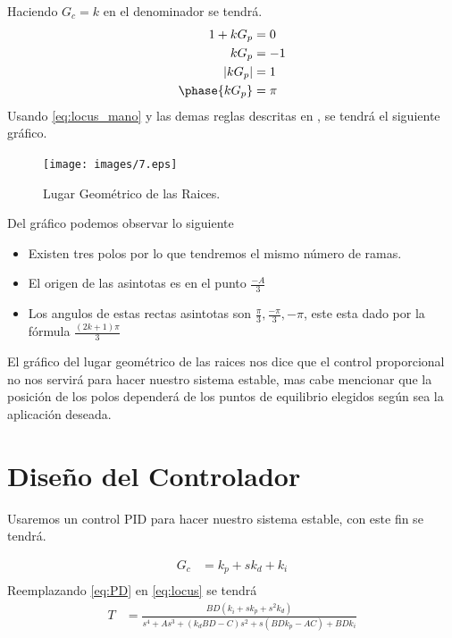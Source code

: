 \documentclass[a4paper]{IEEEtran} %
\begin{document}
Haciendo $G_{c}=k$ en el denominador se tendrá.
\begin{equation}
    \begin{split}
        1+kG_{p}&=0\\
        kG_{p}&=-1\\
        |kG_{p}|&=1\\
        \phase{kG_{p}}&=\pi\\
    \end{split}
    \label{eq:locus_mano}
\end{equation}
Usando \ref{eq:locus_mano} y las demas reglas descritas en  \cite{dorf2005sistemas}, se tendrá el siguiente gráfico.
\begin{figure}[h]
    \centering
        \texttt{[image: images/7.eps]}
        \caption{Lugar Geométrico de las Raices.}
        \label{fig:locus}
\end{figure}

Del gráfico podemos observar lo siguiente

\begin{itemize}
    \item Existen tres polos por lo que tendremos el mismo número de ramas.
    \item El origen de las asintotas es en el punto $\frac{-A}{3}$
    \item Los angulos de estas rectas asintotas son $\frac{\pi}{3},\frac{-\pi}{3},-\pi$, este esta dado por la fórmula $\frac{(2k+1)\pi}{3}$
\end{itemize}

El gráfico del lugar geométrico de las raices nos dice que el control proporcional no nos servirá para hacer nuestro sistema estable, mas cabe mencionar que la posición de los polos dependerá de los puntos de equilibrio elegidos según sea la aplicación deseada. 

\section{Diseño del Controlador}

Usaremos un control PID para hacer nuestro sistema estable, con este fin se tendrá.

\begin{equation}
    \begin{split}
        G_{c}&=k_{p}+sk_{d}+k_{i}\\
    \end{split}
    \label{eq:PD}
\end{equation}
Reemplazando \ref{eq:PD} en \ref{eq:locus} se tendrá
\begin{equation}
    \begin{split}
        T&=\frac{BD(k_{i}+sk_{p}+s^2k_{d})}{s^4+As^3+(k_{d}BD-C)s^2+s(BDk_{p}-AC)+BDk_{i}}\\
    \end{split}
    \label{eq:PD1}
\end{equation}
\end{document}
